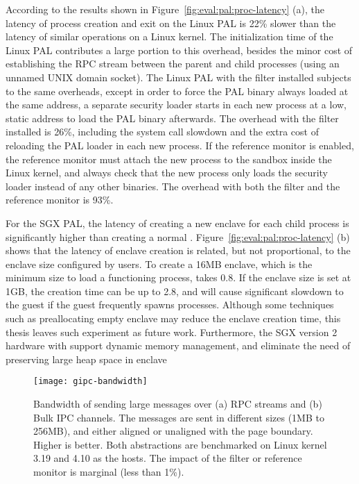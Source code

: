 According to the results shown in
Figure~\ref{fig:eval:pal:proc-latency} (a),
the latency of process creation and exit
on the Linux PAL
is \roughly{}22\% slower than
the latency of similar operations
on a Linux kernel.
The initialization time of the Linux PAL
contributes a large portion to this overhead, besides the minor cost of establishing the RPC stream
between the parent and child processes (using an unnamed UNIX domain socket).
The Linux PAL
with the \seccomp{} filter installed
subjects to the same overheads,
except in order to force the PAL binary always loaded
at the same address,
a separate security loader starts
in each new process
at a low, static address
to load the PAL binary afterwards. 
The overhead with the \seccomp{} filter installed
is \roughly{}26\%,
including the system call slowdown
and the extra cost of reloading the PAL loader in each new process.
If the reference monitor
is enabled,
the reference monitor
must attach the new process to the sandbox
inside the Linux kernel,
and always check that the new process only loads the security loader instead of any other binaries.
The overhead with both the \seccomp{} filter
and the reference monitor
is \roughly{}93\%.



For the SGX PAL,
the latency of creating a new enclave for each child process
is significantly higher
than creating a normal \picoproc{}.
Figure~\ref{fig:eval:pal:proc-latency} (b)
shows that the latency of enclave creation
is related, but not proportional,
to the enclave size configured by users.
To create a 16MB enclave,
which is the minimum size to load a functioning \graphene{} process,
takes \roughly{}0.8\asec{}.
If the enclave size is set at 1GB, the creation time can be up to \roughly{}2.8\asec{},
and will cause significant slowdown
to the guest if the guest frequently spawns processes.
Although some techniques such as
preallocating empty enclave may reduce
the enclave creation time,
this thesis leaves such experiment as future work.
Furthermore,
the SGX version 2 hardware
with support dynamic memory management,
and eliminate the need of preserving large heap space in enclave






 








\begin{figure*}[t!]
\centering
\footnotesize
\texttt{[image: gipc-bandwidth]}
\caption{Bandwidth of sending large messages over (a) RPC streams and (b) Bulk IPC channels. The messages are sent in different sizes (1MB to 256MB), and either aligned or unaligned with the page boundary.
Higher is better. Both abstractions are benchmarked on Linux kernel 3.19 and 4.10 as the hosts. The impact of the \seccomp{} filter or reference monitor is marginal (less than 1\%).}
\label{fig:eval:pal:gipc-bandwidth}
\end{figure*}


